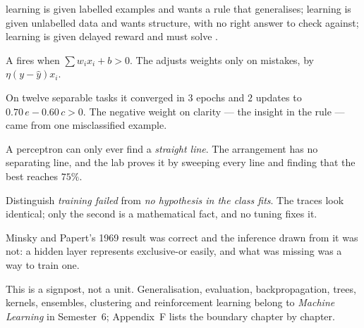 \begin{chaptersummary}
\begin{tight}
  \item {} learning is given labelled examples and wants a rule that
        generalises;  learning is given unlabelled data and wants
        structure, with no right answer to check against; 
        learning is given delayed reward and must solve .
  \item A  fires when $\sum w_{i}x_{i} + b > 0$. The
         adjusts weights only on mistakes, by
        $\eta(y - \hat{y})x_{i}$.
  \item On twelve separable tasks it converged in $3$ epochs and $2$ updates to
        $0.70\,e - 0.60\,c > 0$. The negative weight on clarity --- the insight in
        the rule --- came from one misclassified example.
  \item A perceptron can only ever find a \emph{straight line}. The
         arrangement has no separating line, and the lab proves
        it by sweeping every line and finding that the best reaches $75\%$.
  \item Distinguish \emph{training failed} from \emph{no hypothesis in the class
        fits}. The traces look identical; only the second is a mathematical fact,
        and no tuning fixes it.
  \item Minsky and Papert's 1969 result was correct and the inference drawn from it
        was not: a hidden layer represents exclusive-or easily, and what was missing
        was a way to train one.
  \item This is a signpost, not a unit. Generalisation, evaluation,
        backpropagation, trees, kernels, ensembles, clustering and reinforcement
        learning belong to \emph{Machine Learning} in Semester~6; Appendix~F lists
        the boundary chapter by chapter.
\end{tight}
\end{chaptersummary}

